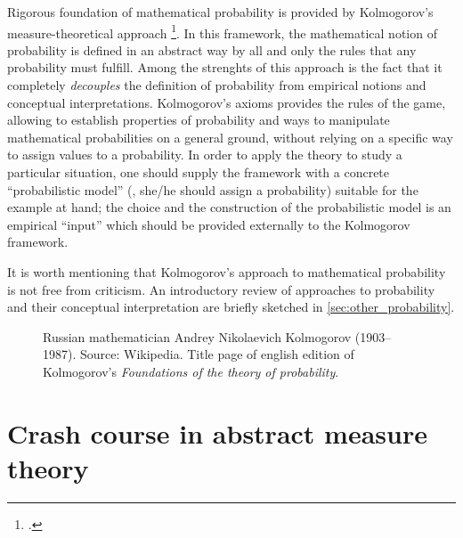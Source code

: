 


\begin{refsection}

   Rigorous foundation of mathematical probability is provided by
   Kolmogorov's measure-theoretical approach%
   \footcite{Kolmogorov:1956}.
   In this framework, the mathematical notion of probability is defined in an abstract way by 
   all and only the rules that any probability must fulfill.
   Among the strenghts of this approach is the fact that it 
   completely \emph{decouples} the definition of probability from empirical
   notions and conceptual interpretations. 
   Kolmogorov's axioms provides the rules of the game, allowing to establish
   properties of probability and ways to manipulate mathematical
   probabilities on a general ground, without relying on a specific way to
   assign values to a probability. 
   In order to apply the theory to study a particular situation, one should supply the
   framework with a concrete ``probabilistic model''
   (\ie, she/he should assign a probability)
   suitable for the example at hand; the choice and the construction of the
   probabilistic model is an empirical ``input'' which should be provided
   externally to
   the Kolmogorov framework.

   It is worth mentioning that Kolmogorov's approach to mathematical
   probability is not free from criticism. 
   An introductory review of approaches to probability and their conceptual
   interpretation 
   are  briefly sketched
   in \cref{sec:other_probability}.

   \begin{figure}
\centering
{}
\quad
{}
\caption{%
   \protect{} Russian mathematician Andrey Nikolaevich Kolmogorov
   (1903--1987). Source: Wikipedia.
   \protect{} Title page of english edition of
   Kolmogorov's \emph{Foundations of the theory of probability}.
}
\end{figure}

\section{Crash course in abstract measure theory}


\end{refsection}
